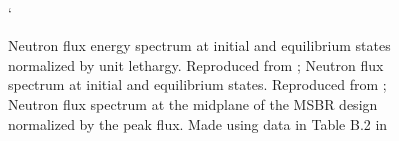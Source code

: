 \begin{figure}[!htpb]
    \centering
    \\`
    \caption[Side-by-side results of MSBR spectra between Ryhklevskii et al (2019) and Park et al (2015)]{
     Neutron flux energy spectrum at
    initial and equilibrium states normalized by unit lethargy. Reproduced
    from \cite{rykhlevskii_modeling_2019}; 
    Neutron flux spectrum at initial and equilibrium states. Reproduced from
    \cite{park_whole_2015};  Neutron flux
    spectrum at the midplane of the MSBR design normalized by the peak flux. Made using data in Table B.2 in \cite{robertson_conceptual_1971}}
    \label{fig:msbr_spectrum_comp}
\end{figure}

